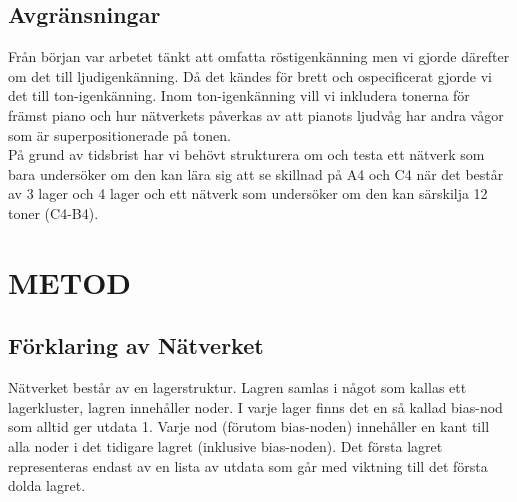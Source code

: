 \documentclass[a4paper,10pt]{article}
\begin{document}
\subsection{Avgränsningar}
Från början var arbetet tänkt att omfatta röstigenkänning men vi gjorde därefter om det till ljudigenkänning. Då det kändes för brett och ospecificerat gjorde vi det till ton-igenkänning. Inom ton-igenkänning vill vi inkludera tonerna för främst piano och hur nätverkets påverkas av att pianots ljudvåg har andra vågor som är superpositionerade på tonen. \\
På grund av tidsbrist har vi behövt strukturera om och testa ett nätverk som bara undersöker om den kan lära sig att se skillnad på A4 och C4 när det består av 3 lager och 4 lager och ett nätverk som undersöker om den kan särskilja 12 toner (C4-B4).

\section{METOD}

\subsection{Förklaring av Nätverket}
Nätverket består av en lagerstruktur. Lagren samlas i något som kallas ett lagerkluster, lagren innehåller noder. I varje lager finns det en så kallad bias-nod som alltid ger utdata 1. Varje nod (förutom bias-noden) innehåller en kant till alla noder i det tidigare lagret (inklusive bias-noden). Det första lagret representeras endast av en lista av utdata som går med viktning till det första dolda lagret.


\end{document}
